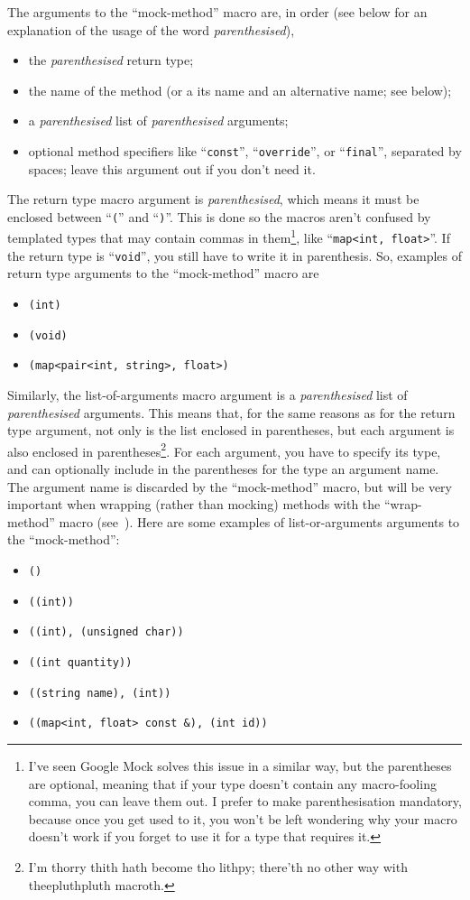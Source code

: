 \documentclass[twoside, a4paper, article]{memoir}
\begin{document}
The arguments to the ``mock-method'' macro are, in order (see below for an
explanation of the usage of the word \emph{parenthesised}),
\begin{itemize}
\item the \emph{parenthesised} return type;
\item the name of the method (or a its name and an alternative name; see
  below);
\item a \emph{parenthesised} list of \emph{parenthesised} arguments;
\item optional method specifiers like ``\texttt{const}'',
  ``\texttt{override}'', or ``\texttt{final}'', separated by spaces; leave this
  argument out if you don't need it.
\end{itemize}

The return type macro argument is \emph{parenthesised}, which means it must be
enclosed between ``\texttt{(}'' and ``\texttt{)}''.  This is done so the macros
aren't confused by templated types that may contain commas in
them\footnote{I've seen Google Mock solves this issue in a similar way, but the
  parentheses are optional, meaning that if your type doesn't contain any
  macro-fooling comma, you can leave them out.  I prefer to make
  parenthesisation mandatory, because once you get used to it, you won't be
  left wondering why your macro doesn't work if you forget to use it for a type
  that requires it.}, like ``\texttt{map<int, float>}''.  If the return type is
``\texttt{void}'', you still have to write it in parenthesis.  So, examples of
return type arguments to the ``mock-method'' macro are
\begin{itemize}
\item \texttt{(int)}
\item \texttt{(void)}
\item \texttt{(map<pair<int, string>, float>)}
\end{itemize}

Similarly, the list-of-arguments macro argument is a \emph{parenthesised} list
of \emph{parenthesised} arguments.  This means that, for the same reasons as
for the return type argument, not only is the list enclosed in parentheses, but
each argument is also enclosed in parentheses\footnote{I'm thorry thith hath
  become tho lithpy; there'th no other way with theepluthpluth macroth.}.  For
each argument, you have to specify its type, and can optionally include in the
parentheses for the type an argument name.  The argument name is discarded by
the ``mock-method'' macro, but will be very important when wrapping (rather
than mocking) methods with the ``wrap-method'' macro
(see~).  Here are some examples of list-or-arguments
arguments to the ``mock-method'':
\begin{itemize}
\item \texttt{()}
\item \texttt{((int))}
\item \texttt{((int), (unsigned char))}
\item \texttt{((int quantity))}
\item \texttt{((string name), (int))}
\item \texttt{((map<int, float> const \&), (int id))}
\end{itemize}
\end{document}
